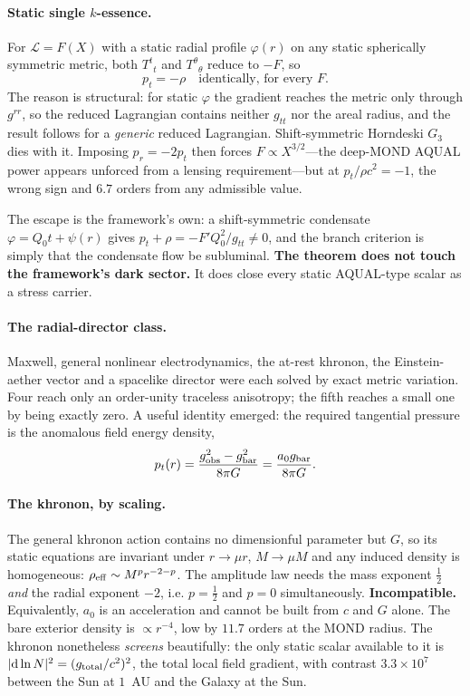 \documentclass[aps,prd,twocolumn,superscriptaddress,nofootinbib,floatfix]{revtex4-2}
\begin{document}
\paragraph{Static single $k$-essence.}
For $\mathcal{L}=F(X)$ with a static radial profile $\varphi(r)$ on any static
spherically symmetric metric, both $T^t{}_t$ and $T^\theta{}_\theta$ reduce to $-F$, so
\begin{equation}
p_t = -\rho \quad\text{identically, for every } F .
\end{equation}
The reason is structural: for static $\varphi$ the gradient reaches the metric only
through $g^{rr}$, so the reduced Lagrangian contains neither $g_{tt}$ nor the areal
radius, and the result follows for a \emph{generic} reduced Lagrangian. Shift-symmetric
Horndeski $G_3$ dies with it. Imposing $p_r=-2p_t$ then forces $F\propto X^{3/2}$---the
deep-MOND AQUAL power appears unforced from a lensing requirement---but at
$p_t/\rho c^2 = -1$, the wrong sign and $6.7$ orders from any admissible value.

The escape is the framework's own: a shift-symmetric condensate
$\varphi = Q_0 t + \psi(r)$ gives $p_t+\rho = -F'Q_0^2/g_{tt}\neq0$, and the branch
criterion is simply that the condensate flow be subluminal. \textbf{The theorem does not
touch the framework's dark sector.} It does close every static AQUAL-type scalar as a
stress carrier.

\paragraph{The radial-director class.}
Maxwell, general nonlinear electrodynamics, the at-rest khronon, the Einstein-aether
vector and a spacelike director were each solved by exact metric variation. Four reach
only an order-unity traceless anisotropy; the fifth reaches a small one by being exactly
zero. A useful identity emerged: the required tangential pressure is the anomalous field
energy density,
\begin{equation}
p_t(r) = \frac{g_{\rm obs}^2-g_{\rm bar}^2}{8\pi G} = \frac{a_0 g_{\rm bar}}{8\pi G}.
\end{equation}

\paragraph{The khronon, by scaling.}
The general khronon action contains no dimensionful parameter but $G$, so its static
equations are invariant under $r\to\mu r$, $M\to\mu M$ and any induced density is
homogeneous: $\rho_{\rm eff}\sim M^p r^{-2-p}$. The amplitude law needs the mass exponent
$\tfrac12$ \emph{and} the radial exponent $-2$, i.e. $p=\tfrac12$ and $p=0$
simultaneously. \textbf{Incompatible.} Equivalently, $a_0$ is an acceleration and cannot
be built from $c$ and $G$ alone. The bare exterior density is $\propto r^{-4}$, low by
$11.7$ orders at the MOND radius. The khronon nonetheless \emph{screens} beautifully: the
only static scalar available to it is $|\mathrm{d}\ln N|^2 = (g_{\rm total}/c^2)^2$, the
total local field gradient, with contrast $3.3\times10^{7}$ between the Sun at $1$~AU and
the Galaxy at the Sun.
\end{document}
